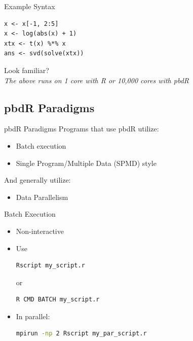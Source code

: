 \begin{frame}[fragile]
  \begin{block}{Example Syntax}\pause
  \begin{lstlisting}
x <- x[-1, 2:5]
x <- log(abs(x) + 1)
xtx <- t(x) %*% x
ans <- svd(solve(xtx))
  \end{lstlisting}
  \begin{center}
  \pause Look familiar?\\[.4cm] \pause
  \emph{The above runs on 1 core with R or 10,000 cores with pbdR}
  \end{center}
  \end{block}
\end{frame}



\subsection{pbdR Paradigms}

\begin{frame}
  \begin{block}{pbdR Paradigms}
  Programs that use pbdR utilize:
  \begin{itemize}[<+-|alert@+>]
   \item Batch execution
   \item Single Program/Multiple Data (SPMD) style
   \\[.2cm]
   \end{itemize}
    And generally utilize:
   \begin{itemize}
   \item Data Parallelism
  \end{itemize}
  \end{block}
\end{frame}


\begin{frame}[fragile]
  \begin{block}{Batch Execution}\pause
    \begin{itemize}
      \item Non-interactive
      \item Use
\vspace{-.4cm}
\begin{lstlisting}[language=sh]
Rscript my_script.r
\end{lstlisting}
or\vspace{-.4cm}
\begin{lstlisting}[language=sh]
R CMD BATCH my_script.r
\end{lstlisting}
      \item In parallel:
\vspace{-.4cm}
\begin{lstlisting}[language=sh]
mpirun -np 2 Rscript my_par_script.r
\end{lstlisting}
    \end{itemize}
  \end{block}
\end{frame}



